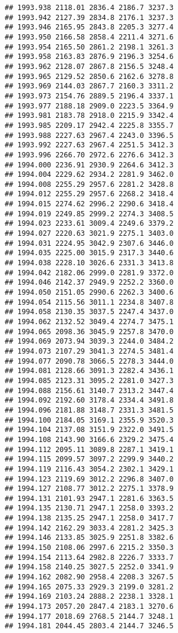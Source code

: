 \documentclass[
]{article}
\begin{document}
\begin{verbatim}
## 1993.938 2118.01 2836.4 2186.7 3237.3
## 1993.942 2127.39 2834.8 2176.1 3237.3
## 1993.946 2165.95 2843.8 2205.3 3277.4
## 1993.950 2166.58 2858.4 2211.4 3271.6
## 1993.954 2165.50 2861.2 2198.1 3261.3
## 1993.958 2163.83 2876.9 2196.3 3254.6
## 1993.962 2128.07 2867.8 2156.5 3248.4
## 1993.965 2129.52 2850.6 2162.6 3278.8
## 1993.969 2144.03 2867.7 2160.3 3311.2
## 1993.973 2154.76 2889.5 2196.4 3337.1
## 1993.977 2188.18 2909.0 2223.5 3364.9
## 1993.981 2183.78 2918.0 2215.9 3342.4
## 1993.985 2209.17 2942.4 2225.8 3355.7
## 1993.988 2227.63 2967.4 2243.0 3396.5
## 1993.992 2227.63 2967.4 2251.5 3412.3
## 1993.996 2266.70 2972.6 2276.6 3412.3
## 1994.000 2236.91 2930.9 2264.6 3412.3
## 1994.004 2229.62 2934.2 2281.9 3462.0
## 1994.008 2255.29 2957.6 2281.2 3428.8
## 1994.012 2255.29 2957.6 2268.2 3418.4
## 1994.015 2274.62 2996.2 2290.6 3418.4
## 1994.019 2249.85 2999.2 2274.3 3408.5
## 1994.023 2233.61 3009.4 2249.6 3379.2
## 1994.027 2220.63 3021.9 2275.1 3403.0
## 1994.031 2224.95 3042.9 2307.6 3446.0
## 1994.035 2225.00 3015.9 2317.3 3440.6
## 1994.038 2228.10 3026.6 2331.3 3413.8
## 1994.042 2182.06 2999.0 2281.9 3372.0
## 1994.046 2142.37 2949.9 2252.2 3360.0
## 1994.050 2151.05 2990.6 2262.3 3400.6
## 1994.054 2115.56 3011.1 2234.8 3407.8
## 1994.058 2130.35 3037.5 2247.4 3437.0
## 1994.062 2132.52 3049.4 2274.7 3475.1
## 1994.065 2098.36 3045.9 2257.8 3470.0
## 1994.069 2073.94 3039.3 2244.0 3484.2
## 1994.073 2107.29 3041.3 2274.5 3481.4
## 1994.077 2090.78 3066.5 2278.3 3444.0
## 1994.081 2128.66 3091.3 2282.4 3436.1
## 1994.085 2123.31 3095.2 2281.0 3427.3
## 1994.088 2156.61 3140.7 2313.2 3447.4
## 1994.092 2192.60 3178.4 2334.4 3491.8
## 1994.096 2181.88 3148.7 2331.3 3481.5
## 1994.100 2184.05 3169.1 2355.9 3520.3
## 1994.104 2137.08 3151.9 2322.0 3491.5
## 1994.108 2143.90 3166.6 2329.2 3475.4
## 1994.112 2095.11 3089.8 2287.1 3419.1
## 1994.115 2099.57 3097.2 2299.9 3440.2
## 1994.119 2116.43 3054.2 2302.1 3429.1
## 1994.123 2119.69 3012.2 2296.8 3407.0
## 1994.127 2108.77 3012.2 2275.1 3378.9
## 1994.131 2101.93 2947.1 2281.6 3363.5
## 1994.135 2130.71 2947.1 2258.0 3393.2
## 1994.138 2135.25 2947.1 2258.0 3417.7
## 1994.142 2162.29 3033.4 2281.2 3425.3
## 1994.146 2133.85 3025.9 2251.8 3382.6
## 1994.150 2108.06 2997.6 2215.2 3350.3
## 1994.154 2113.64 2982.8 2226.7 3333.7
## 1994.158 2140.25 3027.5 2252.0 3341.9
## 1994.162 2082.90 2958.4 2208.3 3267.5
## 1994.165 2075.33 2929.3 2199.0 3281.2
## 1994.169 2103.24 2888.2 2238.1 3328.1
## 1994.173 2057.20 2847.4 2183.1 3270.6
## 1994.177 2018.69 2768.5 2144.7 3248.1
## 1994.181 2044.45 2803.4 2144.7 3246.5

\end{verbatim}
\end{document}
